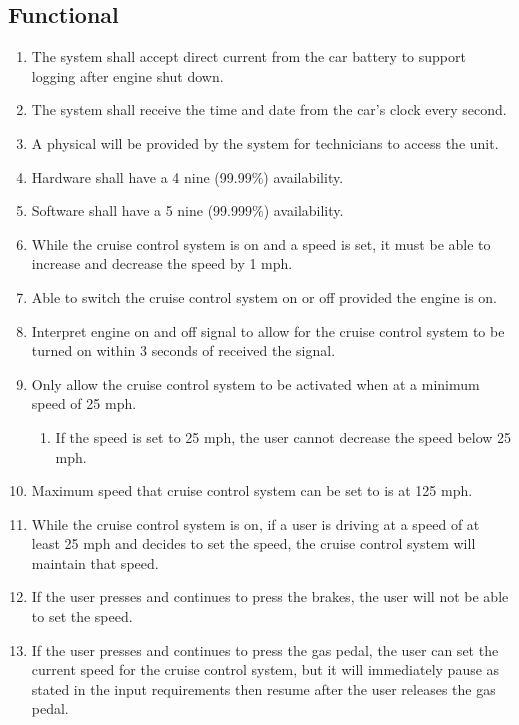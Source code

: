 \documentclass[preprint,11pt,3p]{article}
\begin{document}
\subsection{Functional}
\begin{enumerate}
	\item The system shall accept direct current from the car battery to support logging after engine shut down.
	\item The system shall receive the time and date from the car's clock every second.
	\item A physical will be provided by the system for technicians to access the unit.
	\item Hardware shall have a 4 nine (99.99\%) availability.
	\item Software shall have a 5 nine (99.999\%) availability.
	\item While the cruise control system is on and a speed is set, it must be able to increase and decrease the speed by 1 mph.
	\item Able to switch the cruise control system on or off provided the engine is on.
	\item Interpret engine on and off signal to allow for the cruise control system to be turned on within 3 seconds of received the signal.
	\item Only allow the cruise control system to be activated when at a minimum speed of 25 mph. 
		\begin{enumerate}
			\item If the speed is set to 25 mph, the user cannot decrease the speed below 25 mph.
		\end{enumerate} %
	\item Maximum speed that cruise control system can be set to is at 125 mph.
	\item While the cruise control system is on, if a user is driving at a speed of at least 25 mph and decides to set the speed, the cruise control system will maintain that speed.
	\item If the user presses and continues to press the brakes, the user will not be able to set the speed.
	\item If the user presses and continues to press the gas pedal, the user can set the current speed for the cruise control system, but it will immediately pause as stated in the input requirements then resume after the user releases the gas pedal.
\end{enumerate}
\end{document}
